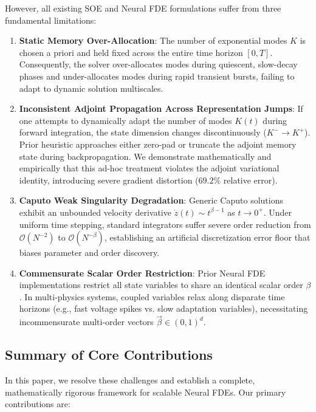 \documentclass[11pt,a4paper]{article}
\theoremstyle{plain}
\theoremstyle{definition}
\begin{document}
However, all existing SOE and Neural FDE formulations suffer from three fundamental limitations:
\begin{enumerate}
    \item \textbf{Static Memory Over-Allocation}: The number of exponential modes $K$ is chosen a priori and held fixed across the entire time horizon $[0, T]$. Consequently, the solver over-allocates modes during quiescent, slow-decay phases and under-allocates modes during rapid transient bursts, failing to adapt to dynamic solution multiscales.
    \item \textbf{Inconsistent Adjoint Propagation Across Representation Jumps}: If one attempts to dynamically adapt the number of modes $K(t)$ during forward integration, the state dimension changes discontinuously ($K^- \to K^+$). Prior heuristic approaches either zero-pad or truncate the adjoint memory state during backpropagation. We demonstrate mathematically and empirically that this ad-hoc treatment violates the adjoint variational identity, introducing severe gradient distortion ($69.2\%$ relative error).
    \item \textbf{Caputo Weak Singularity Degradation}: Generic Caputo solutions exhibit an unbounded velocity derivative $\dot{z}(t) \sim t^{\beta-1}$ as $t \to 0^+$. Under uniform time stepping, standard integrators suffer severe order reduction from $\mathcal{O}(N^{-2})$ to $\mathcal{O}(N^{-\beta})$, establishing an artificial discretization error floor that biases parameter and order discovery.
    \item \textbf{Commensurate Scalar Order Restriction}: Prior Neural FDE implementations restrict all state variables to share an identical scalar order $\beta$. In multi-physics systems, coupled variables relax along disparate time horizons (e.g., fast voltage spikes vs. slow adaptation variables), necessitating incommensurate multi-order vectors $\vec{\beta} \in (0, 1)^d$.
\end{enumerate}

\subsection{Summary of Core Contributions}
In this paper, we resolve these challenges and establish a complete, mathematically rigorous framework for scalable Neural FDEs. Our primary contributions are:
\end{document}
